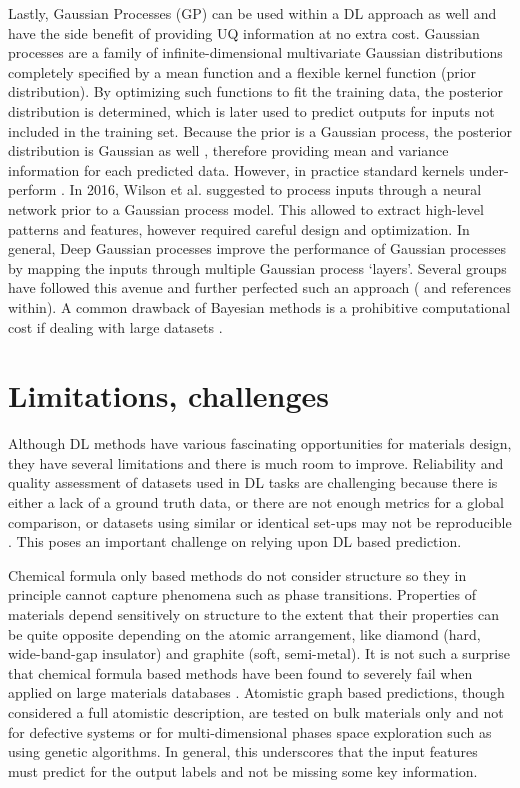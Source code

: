 \documentclass[pdflatex,sn-mathphys]{sn-jnl}%
\theoremstyle{thmstyleone}%
\theoremstyle{thmstyletwo}%
\theoremstyle{thmstylethree}%
\begin{document}
Lastly, Gaussian Processes (GP) can be used within a DL approach as well and have the side benefit of providing UQ information at no extra cost. Gaussian processes are a family of infinite-dimensional multivariate Gaussian distributions completely specified by a mean function and a flexible kernel function (prior distribution). By optimizing such functions to fit the training data, the posterior distribution is determined, which is later used to predict outputs for inputs not included in the training set. Because the prior is a Gaussian process, the posterior distribution is Gaussian as well \cite{rasmussen2003gaussian}, therefore providing mean and variance information for each predicted data. However, in practice standard kernels under-perform \cite{hegde2018deep}. In 2016, Wilson et al. \cite{wilson2016deep} suggested to process inputs through a neural network prior to a Gaussian process model. This allowed to extract high-level patterns and features, however required careful design and optimization. In general, Deep Gaussian processes improve the performance of Gaussian processes by mapping the inputs through multiple Gaussian process `layers'. Several groups have followed this avenue and further perfected such an approach (\cite{hegde2018deep} and references within). A common drawback of Bayesian methods is a prohibitive computational cost if dealing with large datasets \cite{gal2016dropout}.

\section{Limitations, challenges}\label{sec:challenges}
 
Although DL methods have various fascinating opportunities for materials design, they have several limitations and there is much room to improve. Reliability and quality assessment of datasets used in DL tasks are challenging because there is either a lack of a ground truth data, or there are not enough metrics for a global comparison, or datasets using similar or identical set-ups may not be reproducible \cite{hegde2020reproducibility}. This poses an important challenge on relying upon DL based prediction. 

Chemical formula only based methods do not consider structure so they in principle cannot capture phenomena such as phase transitions.  Properties of materials depend sensitively on structure to the extent that their properties can be quite opposite depending on the atomic arrangement, like diamond (hard, wide-band-gap insulator) and graphite (soft, semi-metal). It is not such a surprise that chemical formula based methods have been found to severely fail when applied on large materials databases \cite{bartel2020critical}. Atomistic graph based predictions, though considered a full atomistic description, are tested on bulk materials only and not for defective systems or for multi-dimensional phases space exploration such as using genetic algorithms.  In general, this underscores that the input features must predict for the output labels and not be missing some key information.
\end{document}
